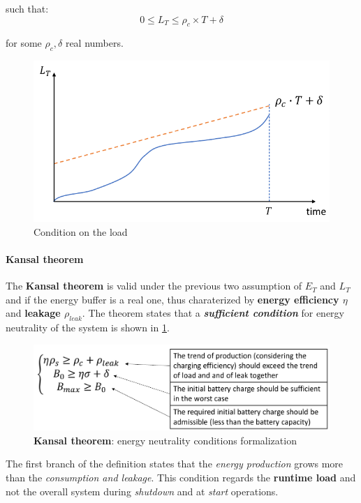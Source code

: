 \documentclass[10pt,a4paper]{report}
\theoremstyle{definition}
\begin{document}
such that:
\begin{equation}
	0 \le L_{T} \le \rho_{c} \times T+\delta
\end{equation}

for some $\rho_{c}, \delta$ real numbers.
\begin{figure}[h]
	\centering\includegraphics[scale=0.30]{images/Pasted image 20230510084605.png}
	\caption{Condition on the load}
	\label{kansal-theorem}
\end{figure}

\paragraph{Kansal theorem}
The \textbf{Kansal theorem} is valid under the previous two assumption of $E_{T}$ and $L_{T}$ and if the energy buffer is a real one, thus charaterized by \textbf{energy efficiency $\eta$} and \textbf{leakage $\rho_{leak}$}.
The theorem states that a \textit{\textbf{sufficient condition}} for energy neutrality of the system is shown in \ref{kansal-theorem}.
\begin{figure}[h]
	\centering
	\includegraphics[scale=0.40]{images/Pasted image 20230509153439.png}
	\caption{\textbf{Kansal theorem}: energy neutrality conditions formalization}
\end{figure}

The first branch of the definition states that the \textit{energy production} grows more than the \textit{consumption and leakage}. This condition regards the \textbf{runtime load} and not the overall system during \textit{shutdown} and at \textit{start} operations.
\end{document}
